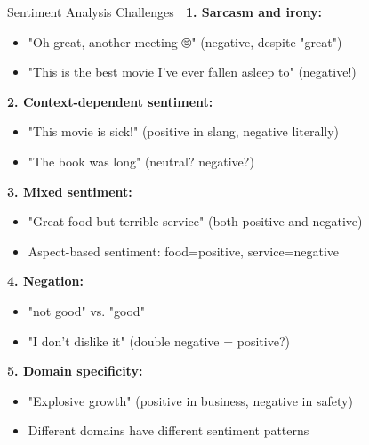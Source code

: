 \documentclass[aspectratio=169]{beamer}
\begin{document}
\begin{frame}[shrink=10]{Sentiment Analysis Challenges 🚧}
    \textbf{1. Sarcasm and irony:}
    \begin{itemize}\setlength{\itemsep}{0pt}
        \item "Oh great, another meeting 🙄" (negative, despite "great")
        \item "This is the best movie I've ever fallen asleep to" (negative!)
    \end{itemize}

    \vspace{0.3em}
    \textbf{2. Context-dependent sentiment:}
    \begin{itemize}\setlength{\itemsep}{0pt}
        \item "This movie is sick!" (positive in slang, negative literally)
        \item "The book was long" (neutral? negative?)
    \end{itemize}

    \vspace{0.3em}
    \textbf{3. Mixed sentiment:}
    \begin{itemize}\setlength{\itemsep}{0pt}
        \item "Great food but terrible service" (both positive and negative)
        \item Aspect-based sentiment: food=positive, service=negative
    \end{itemize}

    \vspace{0.3em}
    \textbf{4. Negation:}
    \begin{itemize}\setlength{\itemsep}{0pt}
        \item "not good" vs. "good"
        \item "I don't dislike it" (double negative = positive?)
    \end{itemize}

    \vspace{0.3em}
    \textbf{5. Domain specificity:}
    \begin{itemize}\setlength{\itemsep}{0pt}
        \item "Explosive growth" (positive in business, negative in safety)
        \item Different domains have different sentiment patterns
    \end{itemize}
\end{frame}
\end{document}
